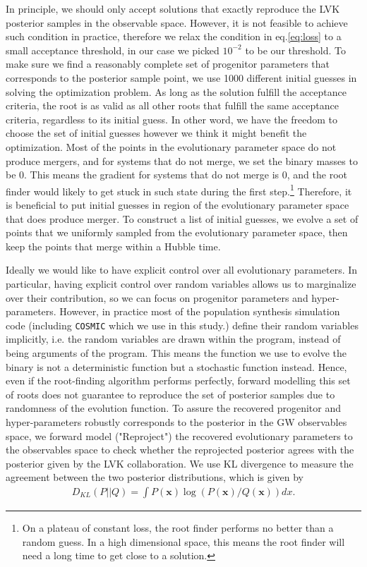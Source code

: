 \documentclass[twocolumn]{aastex631}
\begin{document}
In principle, we should only accept solutions that exactly reproduce the LVK posterior samples in the observable space.
However, it is not feasible to achieve such condition in practice, therefore we relax the condition in eq.\ref{eq:loss} to a small acceptance threshold, in our case we picked $10^{-2}$ to be our threshold.
To make sure we find a reasonably complete set of progenitor parameters that corresponds to the posterior sample point, we use 1000 different initial guesses in solving the optimization problem.
As long as the solution fulfill the acceptance criteria, the root is as valid as all other roots that fulfill the same acceptance criteria, regardless to its initial guess.
In other word, we have the freedom to choose the set of initial guesses however we think it might benefit the optimization.
Most of the points in the evolutionary parameter space do not produce mergers, and for systems that do not merge, we set the binary masses to be 0.
This means the gradient for systems that do not merge is 0, and the root finder would likely to get stuck in such state during the first step.\footnote{On a plateau of constant loss, the root finder performs no better than a random guess. In a high dimensional space, this means the root finder will need a long time to get close to a solution.}
Therefore, it is beneficial to put initial guesses in region of the evolutionary parameter space that does produce merger.
To construct a list of initial guesses, we evolve a set of points that we uniformly sampled from the evolutionary parameter space, then keep the points that merge within a Hubble time.

Ideally we would like to have explicit control over all evolutionary parameters.
In particular, having explicit control over random variables allows us to marginalize over their contribution, so we can focus on progenitor parameters and hyper-parameters.
However, in practice most of the population synthesis simulation code (including \texttt{COSMIC} which we use in this study.) define their random variables implicitly,
i.e. the random variables are drawn within the program, instead of being arguments of the program.
This means the function we use to evolve the binary is not a deterministic function but a stochastic function instead. 
Hence, even if the root-finding algorithm performs perfectly,
forward modelling this set of roots does not guarantee to reproduce the set of posterior samples due to randomness of the evolution function.
To assure the recovered progenitor and hyper-parameters robustly corresponds to the posterior in the GW observables space,
we forward model ("Reproject") the recovered evolutionary parameters to the observables space to check whether the reprojected posterior agrees with the posterior given by the LVK collaboration.
We use KL divergence to measure the agreement between the two posterior distributions, which is given by
\begin{align}
D_{KL}(P||Q) = \int P(\bm{x}) \log(P(\bm{x})/Q(\bm{x})) dx.
\label{eq:KLdivergence}
\end{align}
\end{document}
